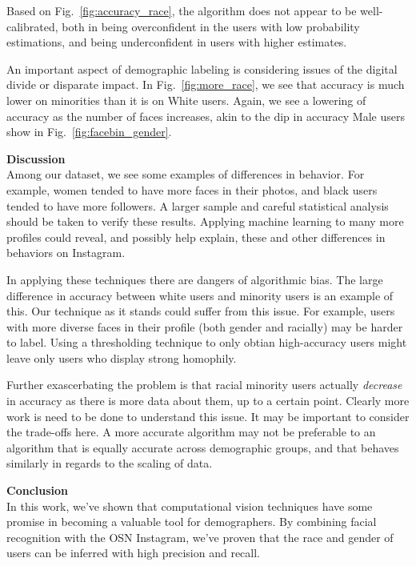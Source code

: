 Based on Fig.~\ref{fig:accuracy_race}, the algorithm does not appear to be well-calibrated, both in being overconfident in the users with low probability estimations, and being underconfident in users with higher estimates.

An important aspect of demographic labeling is considering issues of the digital divide or disparate impact.
In Fig.~\ref{fig:more_race}, we see that accuracy is much lower on minorities than it is on White users.
Again, we see a lowering of accuracy as the number of faces increases, akin to the dip in accuracy Male users show in Fig.~\ref{fig:facebin_gender}.

\textbf{Discussion} \\
Among our dataset, we see some examples of differences in behavior.
For example, women tended to have more faces in their photos, and black users tended to have more followers.
A larger sample and careful statistical analysis should be taken to verify these results.
Applying machine learning to many more profiles could reveal, and possibly help explain, these and other differences in behaviors on Instagram.

In applying these techniques there are dangers of algorithmic bias.
The large difference in accuracy between white users and minority users is an example of this.
Our technique as it stands could suffer from this issue.
For example, users with more diverse faces in their profile (both gender and racially) may be harder to label.
Using a thresholding technique to only obtian high-accuracy users might leave only users who display strong homophily.

Further exascerbating the problem is that racial minority users actually \emph{decrease} in accuracy as there is more data about them, up to a certain point. 
Clearly more work is need to be done to understand this issue.
It may be important to consider the trade-offs here.
A more accurate algorithm may not be preferable to an algorithm that is equally accurate across demographic groups, and that behaves similarly in regards to the scaling of data.

\textbf{Conclusion} \\
In this work, we've shown that computational vision techniques have some promise in becoming a valuable tool for demographers.
By combining facial recognition with the OSN Instagram, we've proven that the race and gender of users can be inferred with high precision and recall.

